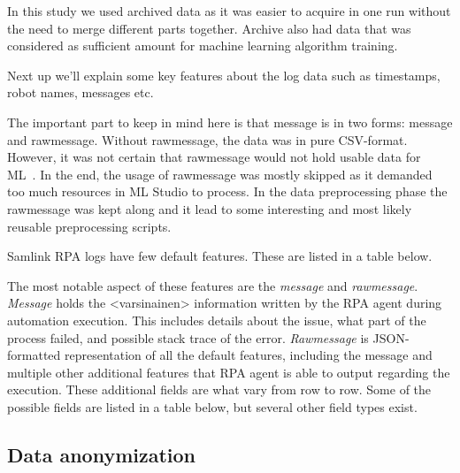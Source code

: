 In this study we used archived data
as it was easier to acquire in one run
without the need to merge different parts together.
Archive also had data
that was considered as sufficient amount
for machine learning algorithm training.

\begin{itcomment} %
    Next up we'll explain some key features about the log data
    such as timestamps, robot names, messages etc.

    The important part to keep in mind here is that message is in two forms:
    message and rawmessage.
    Without rawmessage, the data was in pure CSV-format.
    However, it was not certain that rawmessage would not hold usable data for ML~.
    In the end, the usage of rawmessage was mostly skipped
    as it demanded too much resources in ML Studio to process.
    In the data preprocessing phase the rawmessage was kept along
    and it lead to some interesting and most likely reusable preprocessing scripts.

\end{itcomment}


Samlink RPA logs have few default features. %
These are listed in a table below. %

The most notable aspect of these features
are the \textit{message} and \textit{rawmessage}.
\textit{Message} holds the <varsinainen> %
information written by the RPA agent during automation execution. %
This includes details about the issue,
what part of the process failed,
and possible stack trace of the error.
\textit{Rawmessage} is JSON-formatted representation
of all the default features,
including the message
and multiple other additional features
that RPA agent is able to output regarding the execution.
These additional fields are what vary from row to row. %
Some of the possible fields are listed in a table below, %
but several other field types exist.


\subsection{Data anonymization}\label{subsec:meth-data-anonymization}

